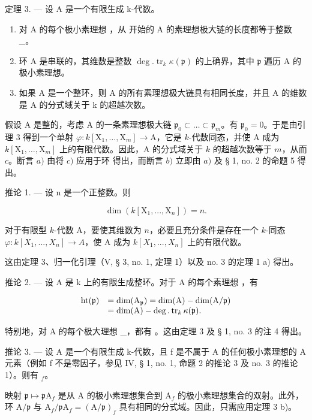 定理 3. — 设 A 是一个有限生成 k-代数。

\begin{enumerate}
\def\labelenumi{\alph{enumi})}
\item
  对 A 的每个极小素理想  ，从  开始的 A 的素理想极大链的长度都等于整数 \_。
\item
  环 A 是串联的，其维数是整数 \(\deg. \operatorname{tr}_{k}\kappa(\mathfrak{p})\) 的上确界，其中 \(\mathfrak{p}\) 遍历 A 的极小素理想。
\item
  如果 A 是一个整环，则 A 的所有素理想极大链具有相同长度，并且 A 的维数是 A 的分式域关于 k 的超越次数。
\end{enumerate}

假设 A 是整的，考虑 A 的一条素理想极大链 \(\mathfrak{p}_0 \subset \ldots \subset \mathfrak{p}_m\)。有 \(\mathfrak{p}_0 = 0\)。于是由引理 3 得到一个单射 \(\varphi : k[\mathrm{X}_1, \ldots, \mathrm{X}_m] \to \mathrm{A}\)，它是 \(k\)-代数同态，并使 A 成为 \(k[\mathrm{X}_1, \ldots, \mathrm{X}_m]\) 上的有限代数。因此，A 的分式域关于 \(k\) 的超越次数等于 \(m\)，从而 \(c\)。断言 \(a)\) 由将 \(c)\) 应用于环  得出，而断言 \(b)\) 立即由 \(a)\) 及 § 1, no. 2 的命题 5 得出。

推论 1. --- 设 n 是一个正整数。则

\[
\dim (k [ \mathrm{X} _ {1},..., \mathrm{X} _ {n} ]) = n.
\]

对于有限型 \(k\)-代数 A，要使其维数为 \(n\)，必要且充分条件是存在一个 \(k\)-同态 \(\varphi: k[X_1, ..., X_n] \to A\)，使 A 成为 \(k[X_1, ..., X_n]\) 上的有限代数。

这由定理 3、归一化引理（V, § 3, no. 1, 定理 1）以及 no. 3 的定理 1 a) 得出。

推论 2. --- 设 A 是 k 上的有限生成整环。对于 A 的每个素理想  ，有

\[
\begin{array}{r l} \mathrm{ht} (\mathfrak {p}) & = \dim (\mathrm{A} _ {\mathfrak {p}}) = \dim (\mathrm{A}) - \dim (\mathrm{A} / \mathfrak {p}) \\ & = \dim (\mathrm{A}) - \deg . \operatorname{tr} _ {k} \kappa (\mathfrak {p}). \end{array}
\]

特别地，对 A 的每个极大理想 \_，都有  。这由定理 3 及 § 1, no. 3 的注 4 得出。

推论 3. --- 设 A 是一个有限生成 k-代数，且 f 是不属于 A 的任何极小素理想的 A 元素（例如 f 不是零因子，参见 IV, § 1, no. 1, 命题 2 的推论 3 及 no. 3 的推论 1）。则有 \(_{f}\)。

映射 \(\mathfrak{p} \mapsto \mathfrak{p}\mathrm{A}_f\) 是从 A 的极小素理想集合到 \(\mathrm{A}_f\) 的极小素理想集合的双射。此外，环 \(\mathrm{A} / \mathfrak{p}\) 与 \(\mathrm{A}_f / \mathfrak{p}\mathrm{A}_f = (\mathrm{A} / \mathfrak{p})_f\) 具有相同的分式域。因此，只需应用定理 3 b)。

